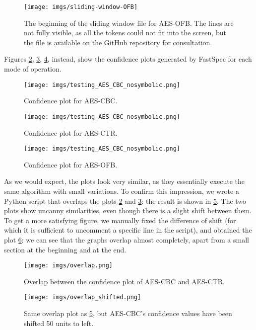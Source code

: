 \documentclass[target=mst,aauheader=aics]{thud}
\theoremstyle{definition}
\begin{document}
\begin{figure}
	\centering
	\texttt{[image: imgs/sliding-window-OFB]}
	\caption{The beginning of the sliding window file for AES-OFB. The lines are not fully visible, as all the tokens could not fit into the screen, but the file is available on the GitHub repository for consultation.}
	\label{fig:sliding-wnd}
\end{figure}

Figures \ref{fig:conf-cbc}, \ref{fig:conf-ctr}, \ref{fig:conf-ofb}, instead, show the confidence plots generated by FastSpec for each mode of operation. 

\begin{figure}[h]
	\centering
	\texttt{[image: imgs/testing\_AES\_CBC\_nosymbolic.png]}
	\caption{Confidence plot for AES-CBC.}
	\label{fig:conf-cbc}
\end{figure}
\begin{figure}[!h]
	\centering
	\texttt{[image: imgs/testing\_AES\_CBC\_nosymbolic.png]}
	\caption{Confidence plot for AES-CTR.}
	\label{fig:conf-ctr}		
\end{figure}
\begin{figure}[!h]
	\centering
	\texttt{[image: imgs/testing\_AES\_CBC\_nosymbolic.png]}
	\caption{Confidence plot for AES-OFB.}
	\label{fig:conf-ofb}
\end{figure}

As we would expect, the plots look very similar, as they essentially execute the same algorithm with small variations.
To confirm this impression, we wrote a Python script that overlaps the plots \ref{fig:conf-cbc} and \ref{fig:conf-ctr}: the result is shown in \ref{fig:overlap}. The two plots show uncanny similarities, even though there is a slight shift between them. To get a more satisfying figure, we manually fixed the difference of shift (for which it is sufficient to uncomment a specific line in the script), and obtained the plot \ref{fig:overlap-shifted}: we can see that the graphs overlap almost completely, apart from a small section at the beginning and at the end.

\begin{figure}
	\hspace*{-0.7cm}
	\texttt{[image: imgs/overlap.png]}
	\caption{Overlap between the confidence plot of AES-CBC and AES-CTR.}
	\label{fig:overlap}
\end{figure}

\begin{figure}
	\hspace*{-0.7cm}
	\texttt{[image: imgs/overlap\_shifted.png]}
	\caption{Same overlap plot as \ref{fig:overlap}, but AES-CBC's confidence values have been shifted 50 units to left.}
	\label{fig:overlap-shifted}
\end{figure}
\end{document}
